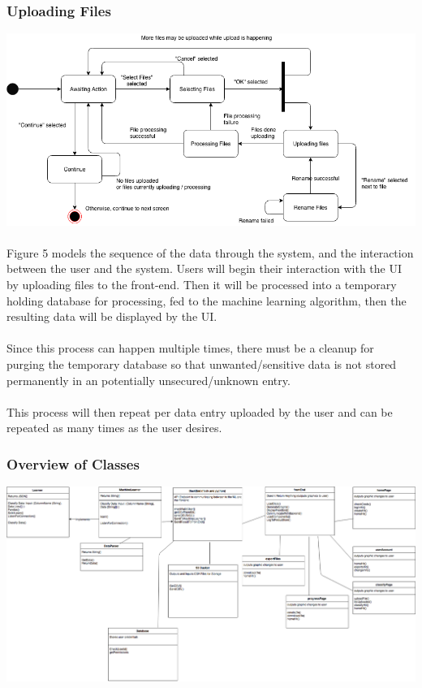 \documentclass[12pt,oneside,letterpaper]{article}
\begin{document}
\subsubsection{Uploading Files}
\includegraphics[scale = 0.52]{spencer_state.png}
\begingroup
{}
\endgroup


\paragraph{}Figure 5 models the sequence of the data through the system, and the interaction between the user and the system. Users will begin their interaction with the UI by uploading files to the front-end. Then it will be processed into a temporary holding database for processing, fed to the machine learning algorithm, then the resulting data will be displayed by the UI.
\paragraph{} Since this process can happen multiple times, there must be a cleanup for purging the temporary database so that unwanted/sensitive data is not stored permanently in an potentially unsecured/unknown entry.
\paragraph{} This process will then repeat per data entry uploaded by the user and can be repeated as many times as the user desires.

\subsubsection{Overview of Classes}
\includegraphics[scale = 0.3]{YarmClassDiagram.png}
\begingroup
{}
\endgroup
\end{document}
